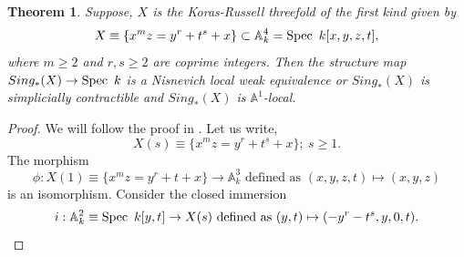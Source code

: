 \documentclass[11pt, reqno]{amsart}
\theoremstyle{plain}
\newtheorem{theorem}[thm]{Theorem}
\theoremstyle{definition}
\newcommand{\Spec}{{\rm Spec \,}}
\newcommand{\A}{{\mathbb A}}
\begin{document}
\begin{theorem} \label{application purity koras}
    Suppose, $X$ is the Koras-Russell threefold of the first kind given by
    $$X \equiv \{x^mz = y^r +t^s+x\} \subset \mathbb{A}^4_k=\Spec\ k[x,y,z,t],$$
    where $m \geq 2$ and $r,s \geq 2$ are coprime integers. Then the structure map $Sing_*(X) \to \Spec\ k$ is a Nisnevich local weak equivalence or $Sing_*(X)$ is simplicially contractible and $Sing_*(X)$ is $\A^1$-local.
\end{theorem}
\begin{proof}
    We will follow the proof in \cite[Section 3.1]{df}. 
Let us write, 
$$X(s) \equiv \{x^mz = y^r +t^s+x\}; \ s \geq 1.$$
The morphism
$$\phi: X(1) \equiv \{x^mz = y^r+t+x\} \to \mathbb{A}^3_k \text{ defined as }(x,y,z,t) \mapsto (x, y ,z)$$
is an isomorphism.
Consider the closed immersion 
$$i: \mathbb{A}^2_k \equiv \Spec\ k[y,t] \to X(s) \text{ defined as } (y,t) \mapsto (-y^r-t^s, y,0, t).$$

\end{proof}
\end{document}
